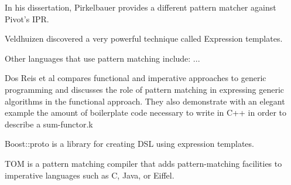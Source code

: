 \documentclass[preprint]{sigplanconf}
\begin{document}
In his dissertation, Pirkelbauer provides a different pattern matcher against 
Pivot's IPR\cite{PirkelbauerThesis}.

Veldhuizen discovered a very powerful technique called Expression 
templates\cite{Veldhuizen95expressiontemplates}.

Other languages that use pattern matching include: ...

Dos Reis et al compares functional and imperative approaches to generic 
programming and discusses the role of pattern matching in expressing generic 
algorithms in the functional approach\cite{dos_reis:05:what_is_gp}. They also 
demonstrate with an elegant example the amount of boilerplate code necessary to 
write in C++ in order to describe a sum-functor.k

Boost::proto is a library for creating DSL using expression templates.

TOM is a pattern matching compiler that adds pattern-matching facilities to 
imperative languages such as C, Java, or Eiffel.\cite{Moreau:2003}

\end{document}
